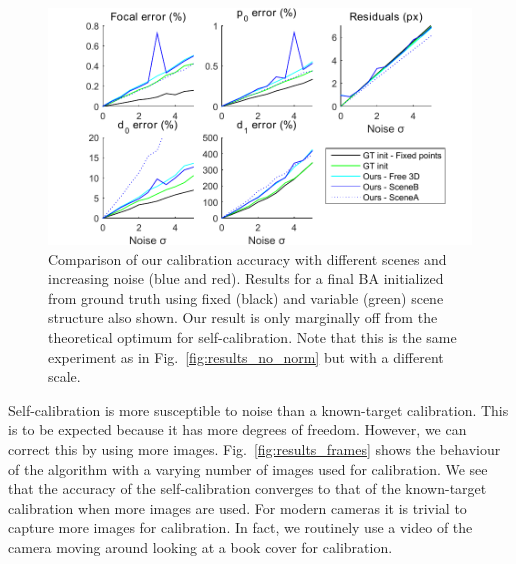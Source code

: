 \documentclass[10pt,twocolumn,letterpaper]{article}
\begin{document}
\begin{figure}
\centering
\includegraphics[width=\linewidth]{images/resultsPointNoise2.pdf}
\caption{Comparison of our calibration accuracy with different scenes and increasing noise (blue and red). Results for a final BA initialized from ground truth using fixed (black) and variable (green) scene structure also shown. Our result is only marginally off from the theoretical optimum for self-calibration. Note that this is the same experiment as in Fig.~\ref{fig:results_no_norm} but with a different scale.}
\label{fig:results_noise}
\end{figure}

Self-calibration is more susceptible to noise than a known-target calibration. This is to be expected because it has more degrees of freedom. However, we can correct this by using more images. Fig.~\ref{fig:results_frames} shows the behaviour of the algorithm with a varying number of images used for calibration. We see that the accuracy of the self-calibration converges to that of the known-target calibration when more images are used. For modern cameras it is trivial to capture more images for calibration. In fact, we routinely use a video of the camera moving around looking at a book cover for calibration.
\end{document}
